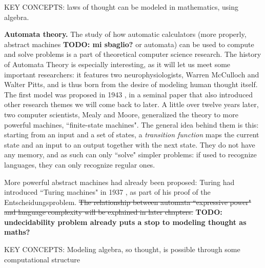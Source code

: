 \documentclass[../main.tex]{subfiles}
\begin{document}
KEY CONCEPTS: laws of thought can be modeled in mathematics, using algebra.

\vspace{4pt}
\textbf{Automata theory.} The study of how automatic calculators (more properly, abstract machines \textbf{TODO: mi sbaglio?} or automata) can be used to compute and solve problems is a part of theoretical computer science research. The history of Automata Theory is especially interesting, as it will let us meet some important researchers: it features two neurophysiologists, Warren McCulloch and Walter Pitts, and is thus born from the desire of modeling human thought itself. The first model was proposed in 1943 \cite{mccullochLogicalCalculusIdeas1943}, in a seminal paper that also introduced other research themes we will come back to later. A little over twelve years later, two computer scientists, Mealy and Moore, generalized the theory to more powerful machines, ``finite-state machines". The general idea behind them is this: starting from an input and a set of states, a \textit{transition function} maps the current state and an input to an output together with the next state. They do not have any memory, and as such can only ``solve" simpler problems: if used to recognize languages, they can only recognize regular ones.

More powerful abstract machines had already been proposed: Turing had introduced ``Turing machines" in 1937 \cite{turingComputableNumbersApplication1937}, as part of his proof of the Entscheidungsproblem. \sout{The relationship between automata ``expressive power" and language complexity will be explained in later chapters.} \textbf{TODO: undecidability problem already puts a stop to modeling thought as maths?}

KEY CONCEPTS: Modeling algebra, so thought, is possible through some computational structure
\end{document}

